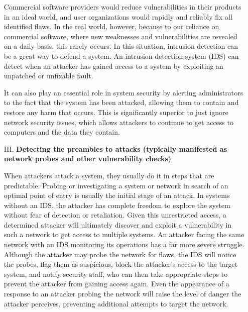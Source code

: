 \documentclass[12pt]{article}
\begin{document}
\begin{enumerate}
        
        \par Commercial software providers would reduce vulnerabilities in their products in an ideal world, and user organizations would rapidly and reliably fix all identified flaws. In the real world, however, because to our reliance on commercial software, where new weaknesses and vulnerabilities are revealed on a daily basis, this rarely occurs. In this situation, intrusion detection can be a great way to defend a system. An intrusion detection system (IDS) can detect when an attacker has gained access to a system by exploiting an unpatched or unfixable fault.
        \\
        
        \par It can also play an essential role in system security by alerting administrators to the fact that the system has been attacked, allowing them to contain and restore any harm that occurs. This is significantly superior to just ignore network security issues, which allows attackers to continue to get access to computers and the data they contain.
        \\
        
        \item[III.] \textbf{Detecting the preambles to attacks (typically manifested as network probes and other vulnerability checks)}
        \par When attackers attack a system, they usually do it in steps that are predictable. Probing or investigating a system or network in search of an optimal point of entry is usually the initial stage of an attack. In systems without an IDS, the attacker has complete freedom to explore the system without fear of detection or retaliation. Given this unrestricted access, a determined attacker will ultimately discover and exploit a vulnerability in such a network to get access to multiple systems. An attacker facing the same network with an IDS monitoring its operations has a far more severe struggle. Although the attacker may probe the network for flaws, the IDS will notice the probes, flag them as suspicious, block the attacker's access to the target system, and notify security staff, who can then take appropriate steps to prevent the attacker from gaining access again. Even the appearance of a response to an attacker probing the network will raise the level of danger the attacker perceives, preventing additional attempts to target the network.
        \\
        

\end{enumerate}
\end{document}
